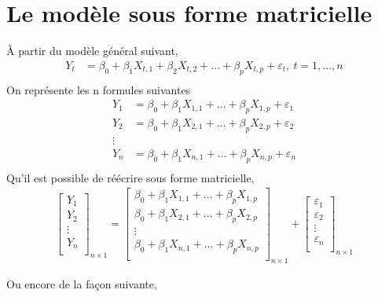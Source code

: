 \documentclass[11pt,french]{report}
\begin{document}
\section{Le modèle sous forme matricielle}
À partir du modèle général suivant, 
\begin{align*}
Y_t &= \beta_0 + \beta_1X_{t,1} + \beta_2X_{t,2} + ... + \beta_pX_{t,p} + \varepsilon_t, \ t = 1,...,n \\
\end{align*}
On représente les n formules suivantes
\begin{align*}
Y_1 &= \beta_0 + \beta_1X_{1,1} + ... + \beta_pX_{1,p} + \varepsilon_1 \\
Y_2 &= \beta_0 + \beta_1X_{2,1} + ... + \beta_pX_{2,p} + \varepsilon_2 \\
\vdots& \\
Y_n &= \beta_0 + \beta_1X_{n,1} + ... + \beta_pX_{n,p} + \varepsilon_n \\
\end{align*}
Qu'il est possible de réécrire sous forme matricielle,
\begin{align*}
\begin{bmatrix} 
Y_1  \\
Y_2  \\
\vdots \\
Y_n \\
\end{bmatrix}_{n\times 1} =
\begin{bmatrix} 
\beta_0 + \beta_1X_{1,1} + ... + \beta_pX_{1,p} \\
\beta_0 + \beta_1X_{2,1} + ... + \beta_pX_{2,p}  \\
\vdots \\
\beta_0 + \beta_1X_{n,1} + ... + \beta_pX_{n,p} \\
\end{bmatrix}_{n\times 1} + 
\begin{bmatrix} 
\varepsilon_1 \\
\varepsilon_2 \\
\vdots \\
\varepsilon_n \\
\end{bmatrix}_{n\times 1} 
\end{align*}

Ou encore de la façon suivante,
\end{document}

